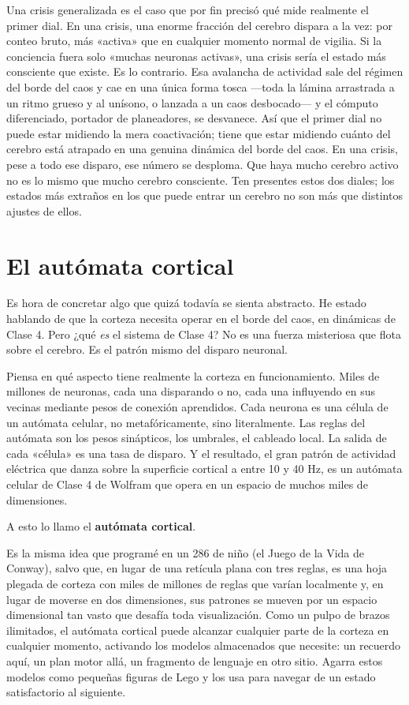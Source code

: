 \documentclass[11pt, twoside, openright]{book}
\begin{document}
Una crisis generalizada es el caso que por fin precisó qué mide realmente el primer dial. En una crisis, una enorme fracción del cerebro dispara a la vez: por conteo bruto, más «activa» que en cualquier momento normal de vigilia. Si la conciencia fuera solo «muchas neuronas activas», una crisis sería el estado más consciente que existe. Es lo contrario. Esa avalancha de actividad sale del régimen del borde del caos y cae en una única forma tosca ---toda la lámina arrastrada a un ritmo grueso y al unísono, o lanzada a un caos desbocado--- y el cómputo diferenciado, portador de planeadores, se desvanece. Así que el primer dial no puede estar midiendo la mera coactivación; tiene que estar midiendo cuánto del cerebro está atrapado en una genuina dinámica del borde del caos. En una crisis, pese a todo ese disparo, ese número se desploma. Que haya mucho cerebro activo no es lo mismo que mucho cerebro consciente. Ten presentes estos dos diales; los estados más extraños en los que puede entrar un cerebro no son más que distintos ajustes de ellos.

\section*{El autómata cortical}

Es hora de concretar algo que quizá todavía se sienta abstracto. He estado hablando de que la corteza necesita operar en el borde del caos, en dinámicas de Clase 4. Pero ¿qué \textit{es} el sistema de Clase 4? No es una fuerza misteriosa que flota sobre el cerebro. Es el patrón mismo del disparo neuronal.

Piensa en qué aspecto tiene realmente la corteza en funcionamiento. Miles de millones de neuronas, cada una disparando o no, cada una influyendo en sus vecinas mediante pesos de conexión aprendidos. Cada neurona es una célula de un autómata celular, no metafóricamente, sino literalmente. Las reglas del autómata son los pesos sinápticos, los umbrales, el cableado local. La salida de cada «célula» es una tasa de disparo. Y el resultado, el gran patrón de actividad eléctrica que danza sobre la superficie cortical a entre 10 y 40 Hz, es un autómata celular de Clase 4 de Wolfram que opera en un espacio de muchos miles de dimensiones.

A esto lo llamo el \textbf{autómata cortical}.

Es la misma idea que programé en un 286 de niño (el Juego de la Vida de Conway), salvo que, en lugar de una retícula plana con tres reglas, es una hoja plegada de corteza con miles de millones de reglas que varían localmente y, en lugar de moverse en dos dimensiones, sus patrones se mueven por un espacio dimensional tan vasto que desafía toda visualización. Como un pulpo de brazos ilimitados, el autómata cortical puede alcanzar cualquier parte de la corteza en cualquier momento, activando los modelos almacenados que necesite: un recuerdo aquí, un plan motor allá, un fragmento de lenguaje en otro sitio. Agarra estos modelos como pequeñas figuras de Lego y los usa para navegar de un estado satisfactorio al siguiente.
\end{document}
